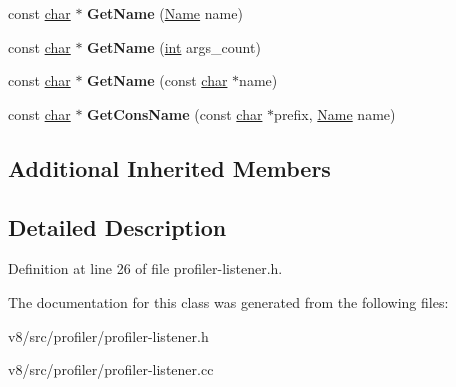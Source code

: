 \begin{DoxyCompactItemize}
\mbox{\label{classv8_1_1internal_1_1ProfilerListener_a0a3e7a365ea99649f7864076a047b57e}} 
const \mbox{\hyperlink{classchar}{char}} $\ast$ {\bfseries Get\+Name} (\mbox{\hyperlink{classv8_1_1internal_1_1Name}{Name}} name)
\item 
\mbox{\label{classv8_1_1internal_1_1ProfilerListener_a3ed9ed40fa37436a4a329b8a4617b9d6}} 
const \mbox{\hyperlink{classchar}{char}} $\ast$ {\bfseries Get\+Name} (\mbox{\hyperlink{classint}{int}} args\+\_\+count)
\item 
\mbox{\label{classv8_1_1internal_1_1ProfilerListener_a8aa379766ddded71011323d72aeac2d1}} 
const \mbox{\hyperlink{classchar}{char}} $\ast$ {\bfseries Get\+Name} (const \mbox{\hyperlink{classchar}{char}} $\ast$name)
\item 
\mbox{\label{classv8_1_1internal_1_1ProfilerListener_a331a4baab12ed1e1f3d0cc5b76a4b05b}} 
const \mbox{\hyperlink{classchar}{char}} $\ast$ {\bfseries Get\+Cons\+Name} (const \mbox{\hyperlink{classchar}{char}} $\ast$prefix, \mbox{\hyperlink{classv8_1_1internal_1_1Name}{Name}} name)
\end{DoxyCompactItemize}
\subsection*{Additional Inherited Members}


\subsection{Detailed Description}


Definition at line 26 of file profiler-\/listener.\+h.



The documentation for this class was generated from the following files\+:\begin{DoxyCompactItemize}
\item 
v8/src/profiler/profiler-\/listener.\+h\item 
v8/src/profiler/profiler-\/listener.\+cc\end{DoxyCompactItemize}
